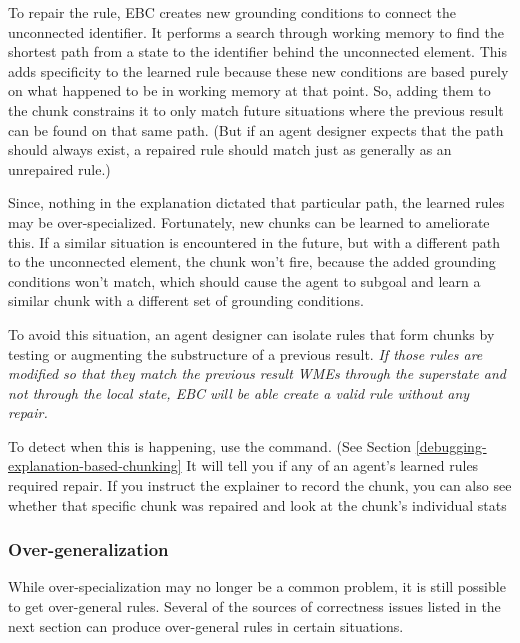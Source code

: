 To repair the rule, EBC creates new grounding conditions to connect the unconnected identifier.  It performs a search through working memory to find the shortest path from a state to the identifier behind the unconnected element.   This adds specificity to the learned rule because these new conditions are based purely on what happened to be in working memory at that point.  So, adding them to the chunk constrains it to only match future situations where the previous result can be found on that same path. (But if an agent designer expects that the path should always exist, a repaired rule should match just as generally as an unrepaired rule.)

Since, nothing in the explanation dictated that particular path, the learned rules may be over-specialized.  Fortunately, new chunks can be learned to ameliorate this.  If a similar situation is encountered in the future, but with a different path to the unconnected element, the chunk won't fire, because the added grounding conditions won't match, which should cause the agent to subgoal and learn a similar chunk with a different set of grounding conditions.

To avoid this situation, an agent designer can isolate rules that form chunks by testing or augmenting the substructure of a previous result.  \emph{If those rules are modified so that they match the previous result WMEs through the superstate and not through the local state, EBC will be able create a valid rule without any repair.} 

To detect when this is happening, use the  command. (See Section \ref{debugging-explanation-based-chunking} It will tell you if any of an agent's learned rules required repair.  If you instruct the explainer to record the chunk, you can also see whether that specific chunk was repaired and look at the chunk's individual stats

\subsubsection{Over-generalization}

While over-specialization may no longer be a common problem, it is still possible to get over-general rules.  Several of the sources of correctness issues listed in the next section can produce over-general rules in certain situations.


